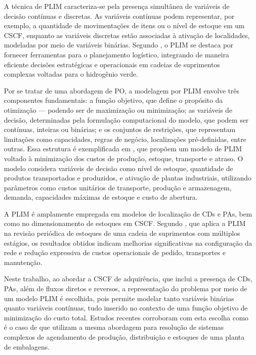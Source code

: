A técnica de PLIM caracteriza-se pela presença simultânea de variáveis de decisão contínuas e discretas. As variáveis contínuas podem representar, por exemplo, a quantidade de movimentações de itens ou o nível de estoque em um CSCF, enquanto as variáveis discretas estão associadas à ativação de localidades, modeladas por meio de variáveis binárias. Segundo , o PLIM se destaca por fornecer ferramentas para o planejamento logístico, integrando de maneira eficiente decisões estratégicas e operacionais em cadeias de suprimentos complexas voltadas para o hidrogênio verde.

Por se tratar de uma abordagem de PO, a modelagem por PLIM envolve três componentes fundamentais: a função objetivo, que define o propósito da otimização — podendo ser de maximização ou minimização; as variáveis de decisão, determinadas pela formulação computacional do modelo, que podem ser contínuas, inteiras ou binárias; e os conjuntos de restrições, que representam limitações como capacidades, regras de negócio, localizações pré-definidas, entre outras. Essa estrutura é exemplificada em , que propõem um modelo de PLIM voltado à minimização dos custos de produção, estoque, transporte e atraso. O modelo considera variáveis de decisão como nível de estoque, quantidade de produtos transportados e produzidos, e ativação de plantas industriais, utilizando parâmetros como custos unitários de transporte, produção e armazenagem, demanda, capacidades máximas de estoque e custo de abertura.

A PLIM é amplamente empregada em modelos de localização de CDs e PAs, bem como no dimensionamento de estoques em CSCF. Segundo , que aplica a PLIM na revisão periódica de estoques de uma cadeia de suprimentos com múltiplos estágios, os resultados obtidos indicam melhorias significativas na configuração da rede e redução expressiva de custos operacionais de pedido, transportes e manutenção.

Neste trabalho, ao abordar a CSCF de adquirência, que inclui a presença de CDs, PAs, além de fluxos diretos e reversos, a representação do problema por meio de um modelo PLIM é escolhida, pois permite modelar tanto variáveis binárias quanto variáveis contínuas, tudo inserido no contexto de uma função objetivo de minimização do custo total. Estudos recentes corroboram com esta escolha como é o caso de  que utilizam a mesma abordagem  para resolução de sistemas complexos de agendamento de produção, distribuição e estoques de uma planta de embalagens.